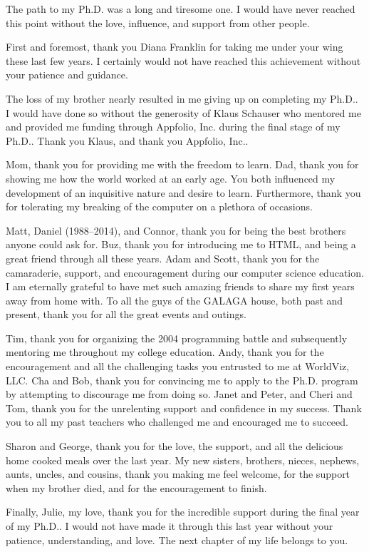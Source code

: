 \begin{acknowledgements}

The path to my Ph.D. was a long and tiresome one. I would have never reached
this point without the love, influence, and support from other people.

First and foremost, thank you Diana Franklin for taking me under your wing
these last few years. I certainly would not have reached this achievement
without your patience and guidance.

The loss of my brother nearly resulted in me giving up on completing my
Ph.D.. I would have done so without the generosity of Klaus Schauser who
mentored me and provided me funding through Appfolio, Inc. during the final
stage of my Ph.D.. Thank you Klaus, and thank you Appfolio, Inc..

Mom, thank you for providing me with the freedom to learn. Dad, thank you for
showing me how the world worked at an early age. You both influenced my
development of an inquisitive nature and desire to learn. Furthermore, thank
you for tolerating my breaking of the computer on a plethora of occasions.

Matt, Daniel (1988--2014), and Connor, thank you for being the best brothers
anyone could ask for. Buz, thank you for introducing me to HTML, and being a
great friend through all these years. Adam and Scott, thank you for the
camaraderie, support, and encouragement during our computer science
education. I am eternally grateful to have met such amazing friends to share my
first years away from home with. To all the guys of the GALAGA house, both past
and present, thank you for all the great events and outings.

Tim, thank you for organizing the 2004 programming battle and subsequently
mentoring me throughout my college education. Andy, thank you for the
encouragement and all the challenging tasks you entrusted to me at WorldViz,
LLC. Cha and Bob, thank you for convincing me to apply to the Ph.D. program by
attempting to discourage me from doing so. Janet and Peter, and Cheri and Tom,
thank you for the unrelenting support and confidence in my success. Thank you
to all my past teachers who challenged me and encouraged me to succeed.

Sharon and George, thank you for the love, the support, and all the delicious
home cooked meals over the last year. My new sisters, brothers, nieces,
nephews, aunts, uncles, and cousins, thank you making me feel welcome, for the
support when my brother died, and for the encouragement to finish.

Finally, Julie, my love, thank you for the incredible support during the final
year of my Ph.D.. I would not have made it through this last year without your
patience, understanding, and love. The next chapter of my life belongs to you.

\end{acknowledgements}
